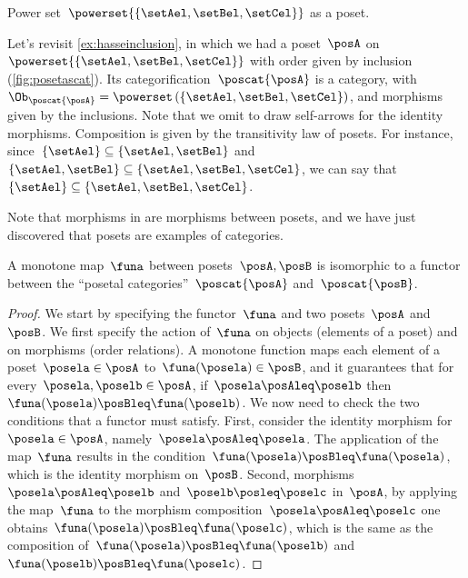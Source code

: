 \begin{marginfigure}
	\centering
	\caption{Power set~$\powerset{\{\setAel,\setBel,\setCel\}}$ as a poset. \label{fig:posetascat}}
\end{marginfigure}

\begin{example}
	Let's revisit \cref{ex:hasseinclusion}, in which we had a poset~$\posA$ on~$\powerset{\{\setAel,\setBel,\setCel\}}$ with order given by inclusion (\cref{fig:posetascat}).
	Its categorification~$\poscat{\posA}$ is a category, with~$\Ob_{\poscat{\posA}}=\powerset\left(\{\setAel,\setBel,\setCel\}\right)$, and morphisms given by the inclusions.
	Note that we omit to draw self-arrows for the identity morphisms.
	Composition is given by the transitivity law of posets.
	For instance, since~$\{\setAel\}\subseteq \{\setAel,\setBel\}$ and~$\{\setAel,\setBel\} \subseteq \{\setAel,\setBel,\setCel\}$, we can say that~$\{\setAel\}\subseteq \{\setAel,\setBel,\setCel\}$.
\end{example}



Note that morphisms in \Pos are morphisms between posets, and we have just discovered that posets are examples of categories.
\begin{lemma}
	\label{lem:posetfunctor}
	A monotone map~$\funa$ between posets~$\posA,\posB$ is isomorphic to a functor between the ``posetal categories''~$\poscat{\posA}$ and~$\poscat{\posB}$.
\end{lemma}
\begin{proof}
	We start by specifying the functor~$\funa$ and two posets~$\posA$ and~$\posB$.
	We first specify the action of~$\funa$ on objects (elements of a poset) and on morphisms (order relations).
	A monotone function maps each element of a poset~$\posela\in \posA$ to~$\funa(\posela) \in \posB$, and it guarantees that for every~$\posela,\poselb\in \posA$, if~$\posela\posAleq \poselb$ then~$\funa(\posela)\posBleq \funa(\poselb)$.
	We now need to check the two conditions that a functor must satisfy.
	First, consider the identity morphism for~$\posela\in \posA$, namely~$\posela \posAleq \posela$.
	The application of the map~$\funa$ results in the condition~$\funa(\posela)\posBleq \funa(\posela)$, which is the identity morphism on~$\posB$.
	Second, morphisms~$\posela\posAleq \poselb$ and~$\poselb\posleq \poselc$ in~$\posA$, by applying the map~$\funa$ to the morphism composition~$\posela\posAleq \poselc$ one obtains~$\funa(\posela)\posBleq \funa(\poselc)$, which is the same as the composition of~$\funa(\posela)\posBleq \funa(\poselb)$ and~$\funa(\poselb)\posBleq \funa(\poselc)$.
\end{proof}

